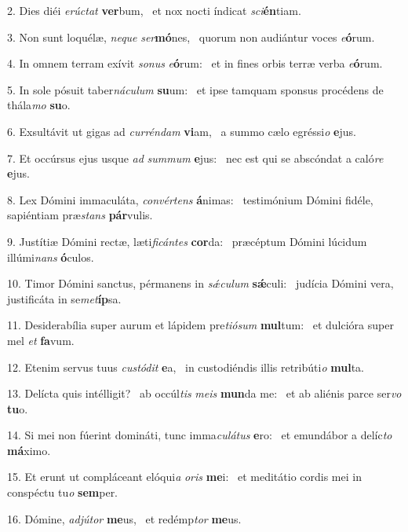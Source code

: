 2. Dies diéi \textit{e}\textit{rúc}\textit{tat} \textbf{ver}bum, \ast\  et nox nocti índicat \textit{sci}\textbf{én}tiam.\

3. Non sunt loquélæ, \textit{ne}\textit{que} \textit{ser}\textbf{mó}nes, \ast\  quorum non audiántur voces \textit{e}\textbf{ó}rum.\

4. In omnem terram exívit \textit{so}\textit{nus} \textit{e}\textbf{ó}rum: \ast\  et in fines orbis terræ verba \textit{e}\textbf{ó}rum.\

5. In sole pósuit taber\textit{ná}\textit{cu}\textit{lum} \textbf{su}um: \ast\  et ipse tamquam sponsus procédens de thála\textit{mo} \textbf{su}o.\

6. Exsultávit ut gigas ad \textit{cur}\textit{rén}\textit{dam} \textbf{vi}am, \ast\  a summo cælo egréssi\textit{o} \textbf{e}jus.\

7. Et occúrsus ejus usque \textit{ad} \textit{sum}\textit{mum} \textbf{e}jus: \ast\  nec est qui se abscóndat a caló\textit{re} \textbf{e}jus.\

8. Lex Dómini immaculáta, \textit{con}\textit{vér}\textit{tens} \textbf{á}nimas: \ast\  testimónium Dómini fidéle, sapiéntiam præ\textit{stans} \textbf{pár}vulis.\

9. Justítiæ Dómini rectæ, læti\textit{fi}\textit{cán}\textit{tes} \textbf{cor}da: \ast\  præcéptum Dómini lúcidum illúmi\textit{nans} \textbf{ó}culos.\

10. Timor Dómini sanctus, pérmanens in \textit{sǽ}\textit{cu}\textit{lum} \textbf{sǽ}culi: \ast\  judícia Dómini vera, justificáta in se\textit{met}\textbf{íp}sa.\

11. Desiderabília super aurum et lápidem pre\textit{ti}\textit{ó}\textit{sum} \textbf{mul}tum: \ast\  et dulcióra super mel \textit{et} \textbf{fa}vum.\

12. Etenim servus tuus \textit{cus}\textit{tó}\textit{dit} \textbf{e}a, \ast\  in custodiéndis illis retribúti\textit{o} \textbf{mul}ta.\

13. Delícta quis intélligit? \dag\  ab occúl\textit{tis} \textit{me}\textit{is} \textbf{mun}da me: \ast\  et ab aliénis parce ser\textit{vo} \textbf{tu}o.\

14. Si mei non fúerint domináti, tunc imma\textit{cu}\textit{lá}\textit{tus} \textbf{e}ro: \ast\  et emundábor a delíc\textit{to} \textbf{má}ximo.\

15. Et erunt ut compláceant elóqui\textit{a} \textit{o}\textit{ris} \textbf{me}i: \ast\  et meditátio cordis mei in conspéctu tu\textit{o} \textbf{sem}per.\

16. Dómine, \textit{ad}\textit{jú}\textit{tor} \textbf{me}us, \ast\  et redémp\textit{tor} \textbf{me}us.\

